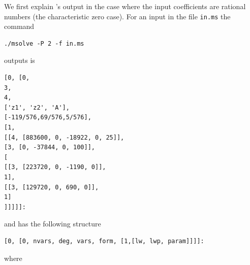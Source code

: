 \documentclass[a4paper,english,11pt]{scrartcl}
\theoremstyle{definition}
\theoremstyle{remark}
\begin{document}
We first explain \msolve's output in the case where the input coefficients are
rational numbers (the characteristic zero case).
For an input in the file \verb+in.ms+
the command
\begin{tcolorbox} %
  \begin{verbatim}
./msolve -P 2 -f in.ms
  \end{verbatim}
\end{tcolorbox}
\msolve outputs is
\begin{tcolorbox} %
  \begin{lstlisting}
[0, [0,
3,
4,
['z1', 'z2', 'A'],
[-119/576,69/576,5/576],
[1,
[[4, [883600, 0, -18922, 0, 25]],
[3, [0, -37844, 0, 100]],
[
[[3, [223720, 0, -1190, 0]],
1],
[[3, [129720, 0, 690, 0]],
1]
]]]]]:
  \end{lstlisting}
\end{tcolorbox}
and
has the following structure
\begin{tcolorbox}
  \begin{lstlisting}
[0, [0, nvars, deg, vars, form, [1,[lw, lwp, param]]]]:
  \end{lstlisting}
\end{tcolorbox}
where
\end{document}
